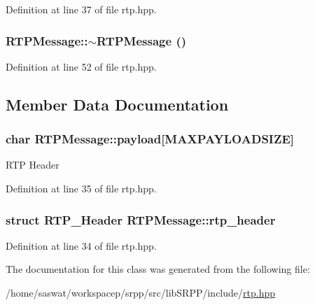 Definition at line 37 of file rtp.hpp.

\hypertarget{class_r_t_p_message_a6bb17ce80caceace4664172db8269c59}{
\subsubsection[{$\sim$RTPMessage}]{\setlength{\rightskip}{0pt plus 5cm}RTPMessage::$\sim$RTPMessage ()}}
\label{class_r_t_p_message_a6bb17ce80caceace4664172db8269c59}


Definition at line 52 of file rtp.hpp.



\subsection{Member Data Documentation}
\hypertarget{class_r_t_p_message_a3773b0ab00e67051db3653feba0c5390}{
\subsubsection[{payload}]{\setlength{\rightskip}{0pt plus 5cm}char {\bf RTPMessage::payload}\mbox{[}MAXPAYLOADSIZE\mbox{]}}}
\label{class_r_t_p_message_a3773b0ab00e67051db3653feba0c5390}
RTP Header 

Definition at line 35 of file rtp.hpp.

\hypertarget{class_r_t_p_message_aa52df33603ba24466f498854fcc5547e}{
\subsubsection[{rtp\_\-header}]{\setlength{\rightskip}{0pt plus 5cm}struct {\bf RTP\_\-Header} {\bf RTPMessage::rtp\_\-header}}}
\label{class_r_t_p_message_aa52df33603ba24466f498854fcc5547e}


Definition at line 34 of file rtp.hpp.



The documentation for this class was generated from the following file:\begin{DoxyCompactItemize}
\item 
/home/saswat/workspacep/srpp/src/libSRPP/include/\hyperlink{rtp_8hpp}{rtp.hpp}\end{DoxyCompactItemize}
